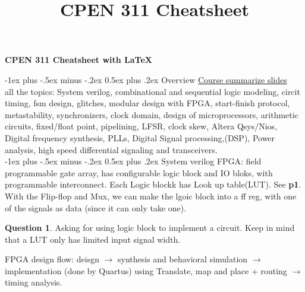 \documentclass[10pt,landscape]{article}
\title{CPEN 311 Cheatsheet}
\makeatletter
\renewcommand{\section}{\@startsection{section}{1}{0mm}%
                                {-1ex plus -.5ex minus -.2ex}%
                                {0.5ex plus .2ex}%
                                {\normalfont\large\bfseries}}
\theoremstyle{definition}
\newtheorem*{question}{Question}
\makeatother
\begin{document}
\raggedright
\footnotesize

\begin{center}
     \Large{\textbf{CPEN 311 Cheatsheet with \LaTeX}} \\
\end{center}
\begin{multicols}{3}
\setlength{\premulticols}{1pt}
\setlength{\postmulticols}{1pt}
\setlength{\multicolsep}{1pt}
\setlength{\columnsep}{2pt}

\section{Overview}
\href{https://drive.google.com/file/d/1k1Rh2W6b5lyQG8Z9oOSLiHAjXUh_RqHa/view}{Course summarize slides} \\
all the topics: System verilog, combinational and sequential logic modeling, circit timing, fsm design, glitches, modular design with FPGA, start-finish protocol, metastability, synchronizers, clock domain, design of microprocessors, arithmetic circuits, fixed/float point, pipelining, LFSR, clock skew, Altera Qsys/Nios, Digital frequency synthesis, PLLs, Digital Signal processing,(DSP), Power analysis, high speed differential signaling and transceivers. \\


\section{System verilog}
FPGA: field programmable gate array, has configurable logic block and IO bloks, with programmable interconnect. Each Logic blockk has Look up table(LUT). See \textbf{p1}. With the Flip-flop and Mux, we can make the lgoic block into a ff reg, with one of the signals as data (since it can only take one). \\
\begin{question}
Asking for using logic block to implement a circuit. Keep in mind that a LUT only has limited input signal width. 
\end{question}

FPGA design flow: deisgn $\rightarrow$ synthesis and behavioral simulation $\rightarrow$ implementation (done by Quartus) using Translate, map and place + routing $\rightarrow$ timing analysis. \\


\end{multicols}
\end{document}
